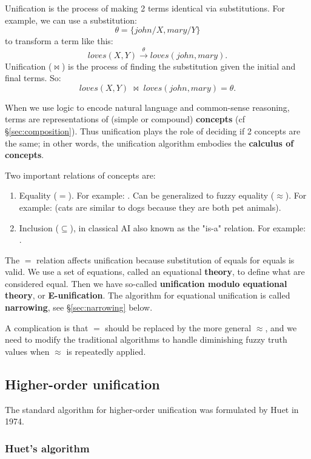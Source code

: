 Unification is the process of making 2 terms identical via substitutions.  For example, we can use a substitution:
$$ \theta = \{ john/X, mary/Y \} $$
to transform a term like this:
$$ loves(X, Y) \stackrel{\theta}{\longrightarrow} loves(john, mary). $$
Unification ($\bowtie$) is the process of finding the substitution given the initial and final terms.  So:
$$ loves(X, Y) \; \bowtie \; loves(john, mary) = \theta .$$

When we use logic to encode natural language and common-sense reasoning, terms are representations of (simple or compound) \textbf{concepts} (cf \S\ref{sec:composition}).  Thus unification plays the role of deciding if 2 concepts are the same; in other words, the unification algorithm embodies the \textbf{calculus of concepts}.

Two important relations of concepts are:
\begin{enumerate}
\item Equality ($=$).  For example: .  Can be generalized to fuzzy equality ($\approx$).   For example:  (cats are similar to dogs because they are both pet animals).
\item Inclusion ($\subseteq$), in classical AI also known as the "is-a" relation.  For example: .
\end{enumerate}

The $=$ relation affects unification because substitution of equals for equals is valid. We use a set of equations, called an equational \textbf{theory}, to define what are considered equal.  Then we have so-called \textbf{unification modulo equational theory}, or \textbf{E-unification}.  The algorithm for equational unification is called \textbf{narrowing}, see \S\ref{sec:narrowing} below.

A complication is that $=$ should be replaced by the more general $\approx$, and we need to modify the traditional algorithms to handle diminishing fuzzy truth values when $\approx$ is repeatedly applied.

\subsection{Higher-order unification}

The standard algorithm for higher-order unification was formulated by Huet in 1974.

\subsubsection{Huet's algorithm}

